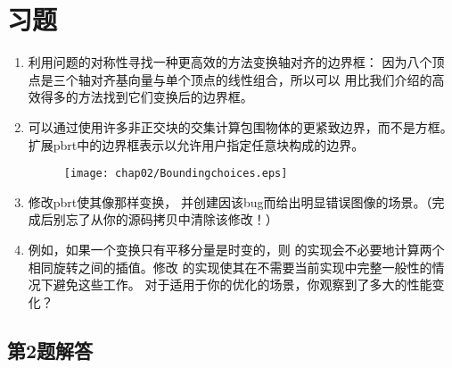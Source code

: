 \section{习题}\label{sec:习题02}

\begin{enumerate}
    \item \circleone 利用问题的对称性寻找一种更高效的方法变换轴对齐的边界框：
          因为八个顶点是三个轴对齐基向量与单个顶点的线性组合，所以可以
          用比我们介绍的高效得多的方法\citep{10.5555/90767.90922}找到它们变换后的边界框。
    \item \circletwo 可以通过使用许多非正交块的交集计算包围物体的更紧致边界，而不是方框。
          扩展pbrt中的边界框表示以允许用户指定任意块构成的边界。
          \begin{figure}[htb]
              \centering\texttt{[image: chap02/Boundingchoices.eps]}
          \end{figure}
    \item \circleone 修改pbrt使其像那样变换，
          并创建因该bug而给出明显错误图像的场景。（完成后别忘了从你的源码拷贝中清除该修改！）
    \item \circletwo 例如，如果一个变换只有平移分量是时变的，则
          的实现会不必要地计算两个相同旋转之间的插值。修改
          的实现使其在不需要当前实现中完整一般性的情况下避免这些工作。
          对于适用于你的优化的场景，你观察到了多大的性能变化？
\end{enumerate}

\subsection*{第2题解答}

